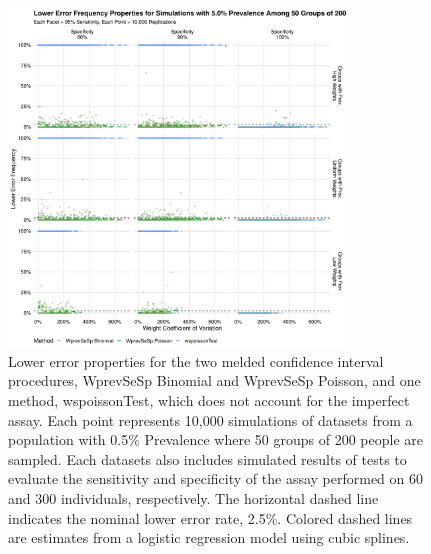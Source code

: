 \documentclass[AMA,STIX1COL]{WileyNJD-v2}
\begin{document}
\begin{figure}
\centering
\includegraphics[width=0.8\textwidth]{figures/imperfect_lower_error_frequency_50_groups_0_05_prev.pdf}
\caption{Lower error properties for the two melded confidence interval procedures, WprevSeSp Binomial and WprevSeSp Poisson, and one method, wspoissonTest, which does not account for the imperfect assay.
Each point represents 10,000 simulations of datasets from a population with 0.5\% Prevalence where 50 groups of 200 people are sampled.
Each datasets also includes simulated results of tests to evaluate the sensitivity and specificity of the assay performed on 60 and 300 individuals, respectively.
The horizontal dashed line indicates the nominal lower error rate, 2.5\%.
Colored dashed lines are estimates from a logistic regression model using cubic splines.}
\label{fig:imperfect_lower_error_frequency_50_groups_0_05_prev}
\end{figure}
\end{document}
